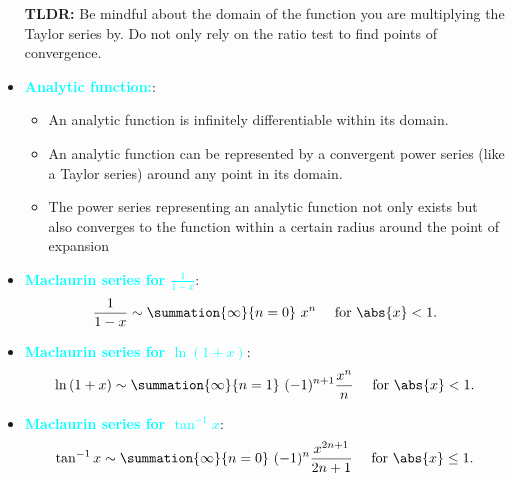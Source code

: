 \documentclass{report}
\begin{document}
\begin{itemize}
                \bigbreak \noindent 
                \textbf{TLDR:} Be mindful about the domain of the function you are multiplying the Taylor series by. Do not only rely on the ratio test to find points of convergence.
            \item \textbf{\textcolor{cyan}{Analytic function:}}: 
                \begin{itemize}
                    \item An analytic function is infinitely differentiable within its domain.
                    \item An analytic function can be represented by a convergent power series (like a Taylor series) around any point in its domain. 
                    \item  The power series representing an analytic function not only exists but also converges to the function within a certain radius around the point of expansion
                \end{itemize}
            \item \textbf{\textcolor{cyan}{Maclaurin series for $\frac{1}{1-x}$}}:
                \begin{align*}
                    \frac{1}{1-x} \sim \summation{\infty}{n=0}\ x^{n} \ \quad \text{for } \abs{x} < 1
                .\end{align*}
            \item \textbf{\textcolor{cyan}{Maclaurin series for $\ln{(1+x)}$}}:
                \begin{align*}
                    \ln{(1+x)} \sim \summation{\infty}{n=1}\ (-1)^{n+1}\frac{x^{n}}{n} \ \quad \text{for }\abs{x} < 1
                .\end{align*}
            \item \textbf{\textcolor{cyan}{Maclaurin series for $\tan^{-1}{x}$}}:
                \begin{align*}
                    \tan^{-1}{x} \sim \summation{\infty}{n=0}\ (-1)^{n}\frac{x^{2n+1}}{2n+1} \ \quad \text{for } \abs{x} \leq 1
                .\end{align*}


\end{itemize}
\end{document}
